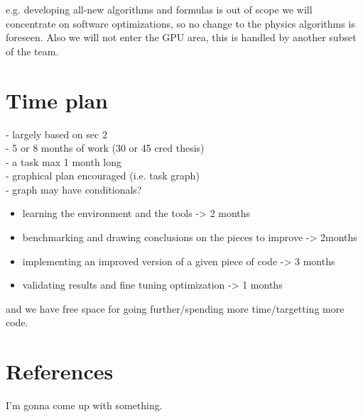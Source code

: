 \documentclass[12pt]{article}
\begin{document}
	e.g. developing all-new algorithms and formulas is out of scope
        \color{blue}
        we will concentrate on software optimizations, so no change to the physics algorithms is foreseen. Also we will not enter the GPU area, this is handled by another subset of the team.
        \color{black}


	\section{Time plan}
		
	\color{red}
	- largely based on sec 2 \\
	- 5 or 8 months of work (30 or 45 cred thesis) \\
	- a task max 1 month long \\
	- graphical plan encouraged (i.e. task graph) \\
	- graph may have conditionals?
	\color{black}
	
	\color{blue}
        \begin{itemize}
        \item learning the environment and the tools -> 2 months
        \item benchmarking and drawing conclusions on the pieces to improve -> 2months
        \item implementing an improved version of a given piece of code -> 3 months
        \item validating results and fine tuning optimization -> 1 months
        \end{itemize}
        and we have free space for going further/spending more time/targetting more code.
        \color{black}
	
	\section{References}
	
	\color{red}
	I'm gonna come up with something.
	\color{black}
	
\end{document}
